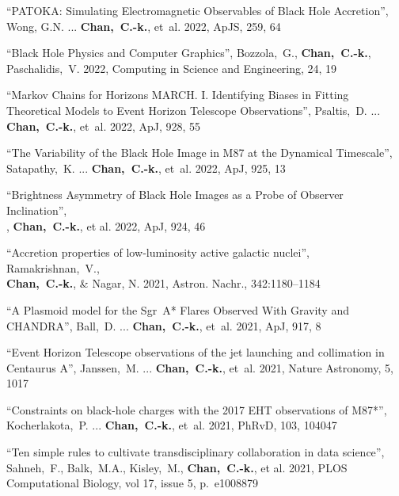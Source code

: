 \begin{ilist}
\item ``PATOKA: Simulating Electromagnetic Observables of Black Hole Accretion'',
  Wong, G.N. ... \textbf{Chan,~C.-k.}, et~al.
  2022, ApJS, 259, 64

\item ``Black Hole Physics and Computer Graphics'',
  Bozzola,~G., \textbf{Chan,~C.-k.}, Paschalidis,~V.
  2022, Computing in Science and Engineering, 24, 19

\item ``Markov Chains for Horizons MARCH. I. Identifying Biases in Fitting Theoretical Models to Event Horizon Telescope Observations'',
  Psaltis,~D. ... \textbf{Chan,~C.-k.}, et~al.
  2022, ApJ, 928, 55

\item ``The Variability of the Black Hole Image in M87 at the Dynamical Timescale'',
  Satapathy,~K. ... \textbf{Chan,~C.-k.}, et~al.
  2022, ApJ, 925, 13

\item ``Brightness Asymmetry of Black Hole Images as a Probe of Observer Inclination'',\\
  , \textbf{Chan,~C.-k.}, et al.
  2022, ApJ, 924, 46

\item ``Accretion properties of low‑luminosity active galactic nuclei'',
  Ramakrishnan,~V.,\\ \textbf{Chan,~C.-k.}, \& Nagar, N.
  2021, Astron. Nachr., 342:1180–1184

\item ``A Plasmoid model for the Sgr~A* Flares Observed With Gravity and CHANDRA'',
  Ball,~D. ... \textbf{Chan,~C.-k.}, et~al.
  2021, ApJ, 917, 8

\item ``Event Horizon Telescope observations of the jet launching and collimation in Centaurus A'',
  Janssen,~M. ... \textbf{Chan,~C.-k.}, et~al.
  2021, Nature Astronomy, 5, 1017

\item ``Constraints on black-hole charges with the 2017 EHT observations of M87*'',
  Kocherlakota,~P. ... \textbf{Chan,~C.-k.}, et~al.
  2021, PhRvD, 103, 104047

\item ``Ten simple rules to cultivate transdisciplinary collaboration in data science'',
  Sahneh,~F., Balk,~M.A., Kisley,~M., \textbf{Chan,~C.-k.}, et al.
  2021, PLOS Computational Biology, vol 17, issue 5, p.~e1008879


\end{ilist}

